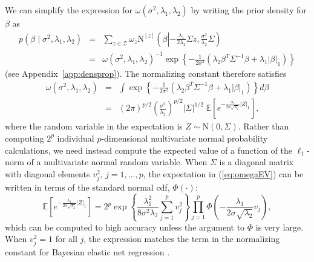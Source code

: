 \documentclass[12pt]{article}
\begin{document}
We can simplify the expression for $\omega(\sigma^2, \lambda_1, \lambda_2)$ by writing the prior density for 
$\beta$ as
\begin{eqnarray*}
	p(\beta \mid \sigma^2, \lambda_1, \lambda_2) &=& \sum_{z \in \mathcal{Z}} \omega_z \mbox{N}^{[z]}
		\left( \beta \left| -\frac{\lambda_1}{2\lambda_2}\Sigma z, \frac{\sigma^2}{\lambda_2}\Sigma\right. \right) \\
	&=& \omega(\sigma^2, \lambda_1, \lambda_2)^{-1} \exp\left\{ -\frac{1}{2\sigma^2}\left( \lambda_2 \beta^T 
		\Sigma^{-1} \beta + \lambda_1 |\beta|_1\right)\right\}
\end{eqnarray*}
(see Appendix~\ref{app:densprop}).
The normalizing constant therefore satisfies
\begin{eqnarray}
	\omega(\sigma^2, \lambda_1, \lambda_2) &=& \int \exp\left\{ -\frac{1}{2\sigma^2}\left( \lambda_2 \beta^T 
		\Sigma^{-1} \beta + \lambda_1 |\beta|_1\right)\right\} d\beta \nonumber \\
		&=& (2\pi)^{p/2} \left(\frac{\sigma^2}{\lambda_2}\right)^{p/2} |\Sigma|^{1/2}\; \mathbb{E}\left[
			e^{-\frac{\lambda_1}{2\sigma \sqrt{\lambda_2}}|Z|_1} \right], \label{eq:omegaEV}
\end{eqnarray}
where the random variable in the expectation is $Z \sim \mbox{N}(0, \Sigma)$. Rather than computing
$2^p$ individual $p$-dimensional multivariate normal probability calculations, we need instead compute 
the expected value of a function of the $\ell_1$-norm of a multivariate normal random variable. When
$\Sigma$ is a diagonal matrix with diagonal elements $v^2_j$, $j=1, \ldots, p$, the expectation in 
(\ref{eq:omegaEV}) can be written in terms of the standard normal cdf, $\Phi(\cdot)$:
\[
	\mathbb{E}\left[e^{-\frac{\lambda_1}{2\sigma \sqrt{\lambda_2}}|Z|_1} \right] =
		2^p \exp\left\{\frac{\lambda_1^2}{8\sigma^2\lambda_2}\sum_{j=1}^p v_j^2\right\}
		\prod_{j=1}^p \Phi\left(-\frac{\lambda_1}{2\sigma\sqrt{\lambda_2}}v_j\right),
\]
which can be computed to high accuracy unless the argument to $\Phi$ is very large.
When $v^2_j = 1$ for all $j$, the expression matches the term in the normalizing constant for
Bayesian elastic net regression \citep[see][]{hans:11}.
\end{document}
